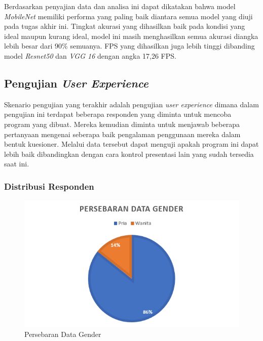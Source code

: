 Berdasarkan penyajian data dan analisa ini dapat dikatakan bahwa model \emph{MobileNet} memiliki performa yang paling baik diantara semua model yang diuji pada tugas akhir ini. Tingkat akurasi yang dihasilkan baik pada kondisi yang ideal maupun kurang ideal, model ini masih menghasilkan semua akurasi diangka lebih besar dari 90\% semuanya. FPS yang dihasilkan juga lebih tinggi dibanding model \emph{Resnet50} dan \emph{VGG 16} dengan angka 17,26 FPS.

\subsection{Pengujian \emph{User Experience}}
\label{subsec:Pengujian User Experience} 

Skenario pengujian yang terakhir adalah pengujian \emph{user experience} dimana dalam pengujian ini terdapat beberapa responden yang diminta untuk mencoba program yang dibuat. Mereka kemudian diminta untuk menjawab beberapa pertanyaan mengenai seberapa baik pengalaman penggunaan mereka dalam bentuk kuesioner. Melalui data tersebut dapat menguji apakah program ini dapat lebih baik dibandingkan dengan cara kontrol presentasi lain yang sudah tersedia saat ini.

\subsubsection{Distribusi Responden}
\label{subsubsec:Distribusi Responden}

\begin{figure}[!htb]
  \centering
  \includegraphics[scale=1]{gambar/pengujian-user-experience/persebaran-data-gender.png}
  \caption{Persebaran Data Gender}
  \label{fig:Persebaran Data Gender}
\end{figure}

